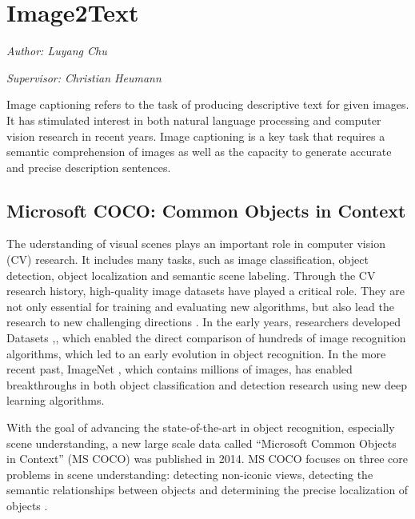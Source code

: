 \documentclass[
]{krantz}
\begin{document}
\hypertarget{c02-01-img2text}{%
\section{Image2Text}\label{c02-01-img2text}}

\emph{Author: Luyang Chu}

\emph{Supervisor: Christian Heumann}

Image captioning refers to the task of producing descriptive text for given images. It has stimulated interest in both natural language processing and computer vision research in recent years. Image captioning is a key task that requires a semantic comprehension of images as well as the capacity to generate accurate and precise description sentences.

\hypertarget{microsoft-coco-common-objects-in-context}{%
\subsection{Microsoft COCO: Common Objects in Context}\label{microsoft-coco-common-objects-in-context}}

The uderstanding of visual scenes plays an important role in computer vision (CV) research. It includes many tasks, such as image classification, object detection, object localization and semantic scene labeling.
Through the CV research history, high-quality image datasets have played a critical role. They are not only essential for training and evaluating new algorithms, but also lead the research to new challenging directions \citep{mccoco}. In the early years, researchers developed Datasets \citep{deng2009imagenet},\citep{sun},\citep{pascalvoc} which enabled the direct comparison of hundreds of image recognition algorithms, which led to an early evolution in object recognition. In the more recent past, ImageNet \citep{deng2009imagenet}, which contains millions of images, has enabled breakthroughs in both object classification and detection research using new deep learning algorithms.

With the goal of advancing the state-of-the-art in object recognition, especially scene understanding, a new large scale data called ``Microsoft Common Objects in Context'' (MS COCO) was published in 2014. MS COCO focuses on three core problems in scene understanding: detecting non-iconic views, detecting the semantic relationships between objects and determining the precise localization of objects \citep{mccoco}.
\end{document}
